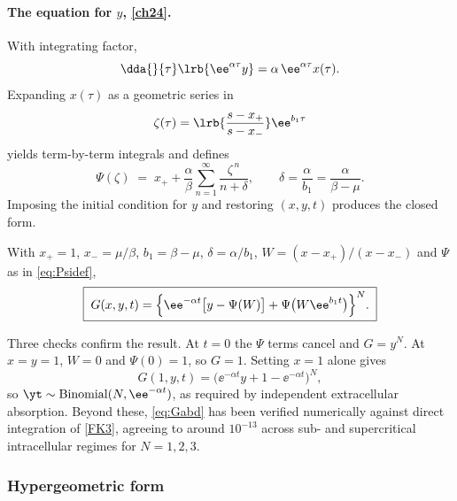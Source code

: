 \paragraph{The equation for \(y\), \eqref{ch24}.}
With integrating factor,
\begin{equation}
\label{eq:yint}
\dda{}{\tau}\lrb{\ee^{\alpha\tau}y} = \alpha\,\ee^{\alpha\tau}x(\tau).
\end{equation}
Expanding \(x(\tau)\) as a geometric series in
\begin{equation*}
\zeta(\tau) = \lrb{\frac{s-x_+}{s-x_-}}\ee^{b_1\tau}
\end{equation*}
yields term-by-term integrals and defines
\begin{equation}
\label{eq:Psidef}
\Psi(\zeta) \;=\; x_+ + \frac{\alpha}{\beta}\sum_{n=1}^{\infty}\frac{\zeta^{\,n}}{n+\delta},
\qquad \delta = \frac{\alpha}{b_1} = \frac{\alpha}{\beta-\mu}.
\end{equation}
Imposing the initial condition for \(y\) and restoring \((x,y,t)\) produces the closed form.

\begin{proposition}
\label{prop:Gabd}
With \(x_+=1\), \(x_-=\mu/\beta\), \(b_1 = \beta-\mu\), \(\delta = \alpha/b_1\),
\(W = (x-x_+)/(x-x_-)\) and \(\Psi\) as in \cref{eq:Psidef},
\begin{equation}
\label{eq:Gabd}
\boxed{\;
G(x,y,t) = \Bigl\{\ee^{-\alpha t}\bigl[y - \Psi(W)\bigr] + \Psi\bigl(W\ee^{b_1 t}\bigr)\Bigr\}^{N}. \;}
\end{equation}
\end{proposition}

Three checks confirm the result. At \(t=0\) the \(\Psi\) terms cancel and \(G=y^N\). At \(x=y=1\), \(W=0\) and \(\Psi(0)=1\), so \(G=1\). Setting \(x=1\) alone gives
\begin{equation*}
G(1,y,t) = \bigl(\ee^{-\alpha t}y + 1 - \ee^{-\alpha t}\bigr)^N,
\end{equation*}
so \(\yt\sim\mathrm{Binomial}(N,\ee^{-\alpha t})\), as required by independent extracellular absorption. Beyond these, \cref{eq:Gabd} has been verified numerically against direct integration of \cref{FK3}, agreeing to around \(10^{-13}\) across sub- and supercritical intracellular regimes for \(N=1,2,3\).

\subsubsection*{Hypergeometric form}

